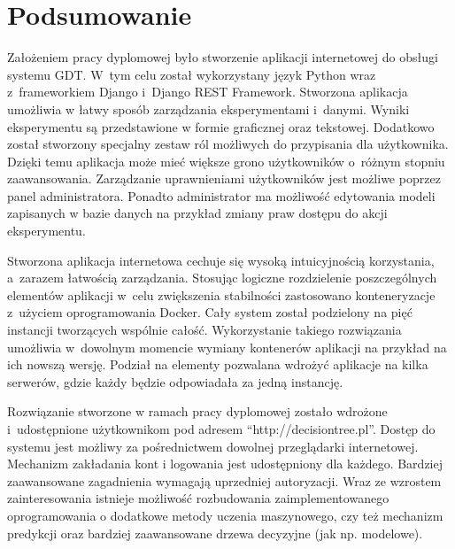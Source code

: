 \chapter*{Podsumowanie}
Założeniem pracy dyplomowej było stworzenie aplikacji internetowej do obsługi systemu GDT. W~tym celu został wykorzystany język Python wraz z~frameworkiem Django i~Django REST Framework. Stworzona aplikacja umożliwia w łatwy sposób zarządzania eksperymentami i~danymi. Wyniki eksperymentu są przedstawione w formie graficznej oraz tekstowej. Dodatkowo został stworzony specjalny zestaw ról możliwych do przypisania dla użytkownika. Dzięki temu aplikacja może mieć większe grono użytkowników o~różnym stopniu zaawansowania. Zarządzanie uprawnieniami użytkowników jest możliwe poprzez panel administratora. Ponadto administrator ma możliwość edytowania modeli zapisanych w bazie danych na przykład zmiany praw dostępu do akcji eksperymentu. 

Stworzona aplikacja internetowa cechuje się wysoką intuicyjnością korzystania, a~zarazem łatwością zarządzania. Stosując logiczne rozdzielenie poszczególnych elementów aplikacji w~celu zwiększenia stabilności zastosowano konteneryzacje z~użyciem oprogramowania Docker. Cały system został podzielony na pięć instancji tworzących wspólnie całość. Wykorzystanie takiego rozwiązania umożliwia w~dowolnym momencie wymiany kontenerów aplikacji na przykład na ich nowszą wersję. Podział na elementy pozwalana wdrożyć aplikacje na kilka serwerów, gdzie każdy będzie odpowiadała za jedną instancję. 

Rozwiązanie stworzone w ramach pracy dyplomowej zostało wdrożone i~udostępnione użytkownikom pod adresem \enquote{http://decisiontree.pl}. Dostęp do systemu jest możliwy za pośrednictwem dowolnej przeglądarki internetowej. Mechanizm zakładania kont i logowania jest udostępniony dla każdego. Bardziej zaawansowane zagadnienia wymagają uprzedniej autoryzacji. Wraz ze wzrostem zainteresowania istnieje możliwość rozbudowania zaimplementowanego oprogramowania o dodatkowe metody uczenia maszynowego, czy też mechanizm predykcji oraz bardziej zaawansowane drzewa decyzyjne (jak np. modelowe).